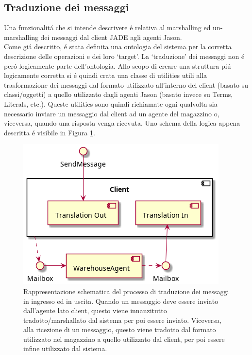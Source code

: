\subsection{Traduzione dei messaggi}
Una funzionalit\'a che si intende descrivere \'e relativa al marshalling ed un-marshalling dei messaggi dal client JADE agli agenti Jason.\\
Come gi\'a descritto, \'e stata definita una ontologia del sistema per la corretta descrizione delle operazioni e dei loro `target'. La `traduzione' dei messaggi non \'e per\'o logicamente parte dell'ontologia. Allo scopo di creare una struttura pi\'u logicamente corretta si \'e quindi crata una classe di utilities utili alla trasformazione dei messaggi dal formato utilizzato all'interno del client (basato su classi/oggetti) a quello utilizzato dagli agenti Jason (basato invece su Terms, Literals, etc.). Queste utilities sono quindi richiamate ogni qualvolta sia necessario inviare un messaggio dal client ad un agente del magazzino o, viceversa, quando una risposta venga ricevuta. Uno schema della logica appena descritta \'e visibile in Figura \ref{fig:message-translation}.
\begin{figure}[!ht]\centering
    \includegraphics[width=.7\textwidth]{section/implementation/figure/message-translation.png}
    \caption{Rappresentazione schematica del processo di traduzione dei messaggi in ingresso ed in uscita. Quando un messaggio deve essere inviato dall'agente lato client, questo viene innanzitutto tradotto/marshallato dal sistema per poi essere inviato. Viceversa, alla ricezione di un messaggio, questo viene tradotto dal formato utilizzato nel magazzino a quello utilizzato dal client, per poi essere infine utilizzato dal sistema.}
    \label{fig:message-translation}
\end{figure}

